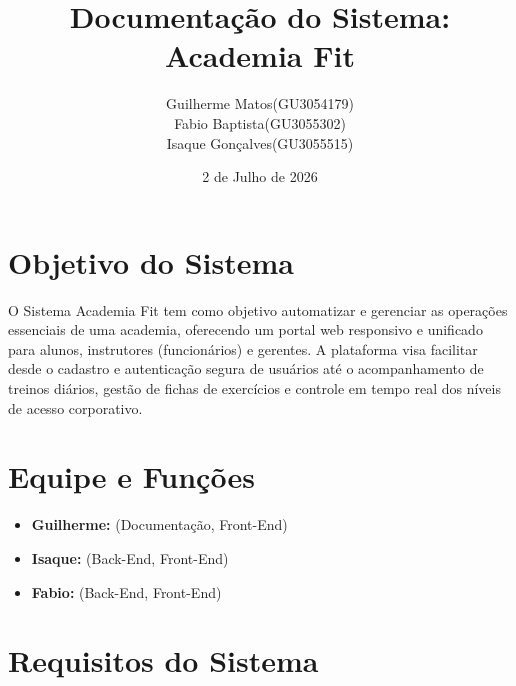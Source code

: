 \documentclass[12pt, a4paper]{article}
\title{\textbf{Documentação do Sistema: Academia Fit}}
\author{Guilherme Matos(GU3054179) \\
    Fabio Baptista(GU3055302)\\
    Isaque Gonçalves(GU3055515)}
\date{2 de Julho de 2026}
\begin{document}
\maketitle
\tableofcontents
\newpage

\section{Objetivo do Sistema}
O Sistema Academia Fit tem como objetivo automatizar e gerenciar as operações essenciais de uma academia, oferecendo um portal web responsivo e unificado para alunos, instrutores (funcionários) e gerentes. A plataforma visa facilitar desde o cadastro e autenticação segura de usuários até o acompanhamento de treinos diários, gestão de fichas de exercícios e controle em tempo real dos níveis de acesso corporativo.

\section{Equipe e Funções}
\begin{itemize}
    \item \textbf{Guilherme:} (Documentação, Front-End)
    \item \textbf{Isaque:} (Back-End, Front-End)
    \item \textbf{Fabio:} (Back-End, Front-End)
\end{itemize}

\section{Requisitos do Sistema}
\end{document}
